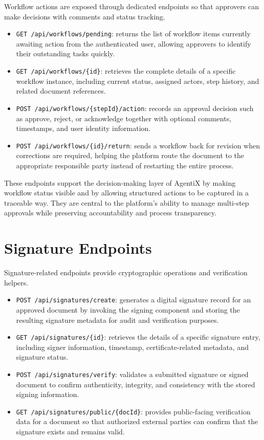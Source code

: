 \documentclass[12pt,oneside,openright,a4paper]{cpe-english-project}
\begin{document}
Workflow actions are exposed through dedicated endpoints so that approvers can make decisions with comments and status tracking.

\begin{itemize}
  \item \texttt{GET /api/workflows/pending}: returns the list of workflow items currently awaiting action from the authenticated user, allowing approvers to identify their outstanding tasks quickly.
  \item \texttt{GET /api/workflows/\{id\}}: retrieves the complete details of a specific workflow instance, including current status, assigned actors, step history, and related document references.
  \item \texttt{POST /api/workflows/\{stepId\}/action}: records an approval decision such as approve, reject, or acknowledge together with optional comments, timestamps, and user identity information.
  \item \texttt{POST /api/workflows/\{id\}/return}: sends a workflow back for revision when corrections are required, helping the platform route the document to the appropriate responsible party instead of restarting the entire process.
\end{itemize}

These endpoints support the decision-making layer of AgentiX by making workflow status visible and by allowing structured actions to be captured in a traceable way. They are central to the platform's ability to manage multi-step approvals while preserving accountability and process transparency.

\section{Signature Endpoints}

Signature-related endpoints provide cryptographic operations and verification helpers.

\begin{itemize}
  \item \texttt{POST /api/signatures/create}: generates a digital signature record for an approved document by invoking the signing component and storing the resulting signature metadata for audit and verification purposes.
  \item \texttt{GET /api/signatures/\{id\}}: retrieves the details of a specific signature entry, including signer information, timestamp, certificate-related metadata, and signature status.
  \item \texttt{POST /api/signatures/verify}: validates a submitted signature or signed document to confirm authenticity, integrity, and consistency with the stored signing information.
  \item \texttt{GET /api/signatures/public/\{docId\}}: provides public-facing verification data for a document so that authorized external parties can confirm that the signature exists and remains valid.
\end{itemize}
\end{document}
